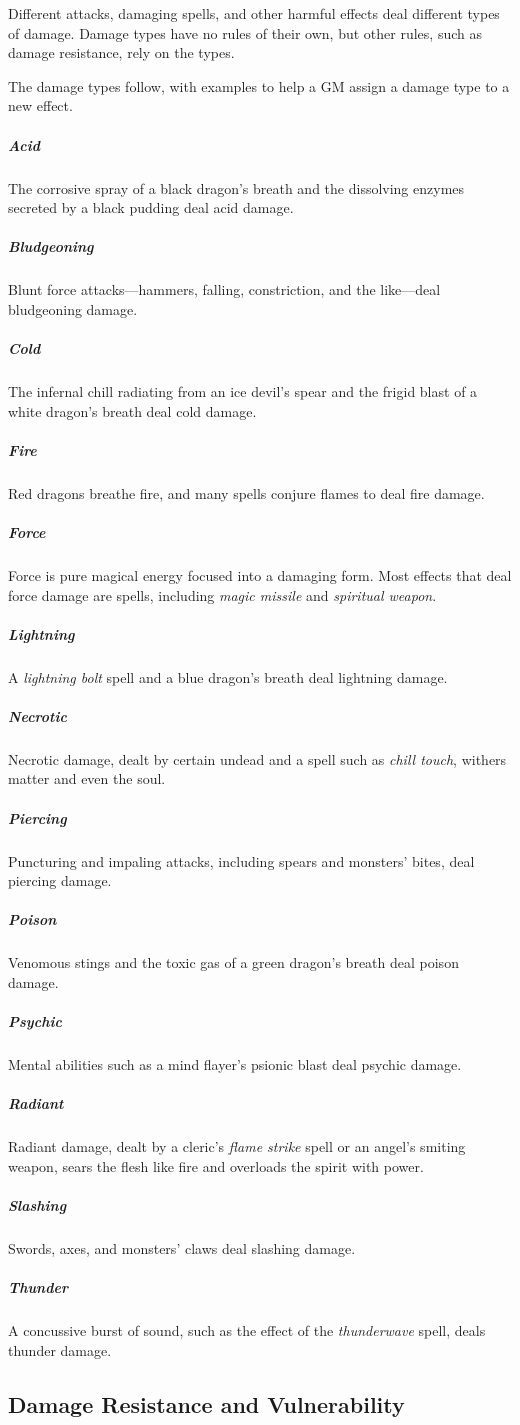 Different attacks, damaging spells, and other harmful effects deal different types of damage. Damage types have no rules of their own, but other rules, such as damage resistance, rely on the types.

The damage types follow, with examples to help a GM assign a damage type to a new effect.

\subparagraph*{Acid} The corrosive spray of a black dragon's breath and the dissolving enzymes secreted by a black pudding deal acid damage.

\subparagraph*{Bludgeoning} Blunt force attacks—hammers, falling, constriction, and the like—deal bludgeoning damage.

\subparagraph*{Cold} The infernal chill radiating from an ice devil's spear and the frigid blast of a white dragon's breath deal cold damage.

\subparagraph*{Fire} Red dragons breathe fire, and many spells conjure flames to deal fire damage.

\subparagraph*{Force} Force is pure magical energy focused into a damaging form. Most effects that deal force damage are spells, including \textit{magic missile} and \textit{spiritual weapon}.

\subparagraph*{Lightning} A \textit{lightning bolt} spell and a blue dragon's breath deal lightning damage.

\subparagraph*{Necrotic} Necrotic damage, dealt by certain undead and a spell such as \textit{chill touch}, withers matter and even the soul.

\subparagraph*{Piercing} Puncturing and impaling attacks, including spears and monsters' bites, deal piercing damage.

\subparagraph*{Poison} Venomous stings and the toxic gas of a green dragon's breath deal poison damage.

\subparagraph*{Psychic} Mental abilities such as a mind flayer's psionic blast deal psychic damage.

\subparagraph*{Radiant} Radiant damage, dealt by a cleric's \textit{flame strike} spell or an angel's smiting weapon, sears the flesh like fire and overloads the spirit with power.

\subparagraph*{Slashing} Swords, axes, and monsters' claws deal slashing damage.

\subparagraph*{Thunder} A concussive burst of sound, such as the effect of the \textit{thunderwave} spell, deals thunder damage.

\subsection{Damage Resistance and Vulnerability}

